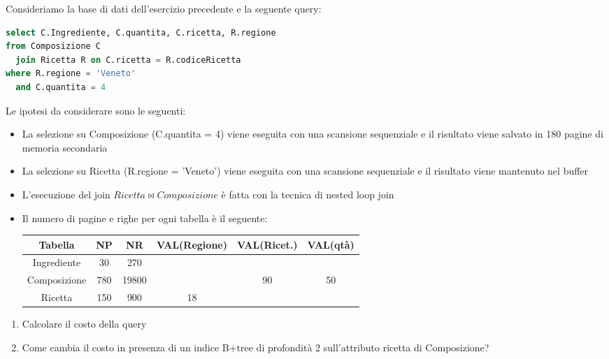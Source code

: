\documentclass[a4paper]{article}
\begin{document}
\begin{exercise}
  Consideriamo la base di dati dell'esercizio precedente e la seguente query:
\begin{lstlisting}[language=sql]
select C.Ingrediente, C.quantita, C.ricetta, R.regione
from Composizione C
  join Ricetta R on C.ricetta = R.codiceRicetta
where R.regione = 'Veneto'
  and C.quantita = 4
\end{lstlisting}
  Le ipotesi da considerare sono le seguenti:
  \begin{itemize}
    \item La selezione su Composizione (C.quantita = 4) viene eseguita con una scansione 
      sequenziale e il risultato viene salvato
      in 180 pagine di memoria secondaria

    \item La selezione su Ricetta (R.regione = 'Veneto') viene eseguita con
      una scansione sequenziale e il risultato viene mantenuto nel buffer

    \item L'esecuzione del join \( Ricetta \bowtie Composizione \) è fatta
      con la tecnica di nested loop join

    \item Il numero di pagine e righe per ogni tabella è il seguente:
      \begin{table}[H]
        \centering
        \begin{tabular}{|c|c|c|c|c|c|}
          \hline
          Tabella & NP & NR & VAL(Regione) & VAL(Ricet.) & VAL(qtà) \\
          \hline
          Ingrediente  & 30  & 270   &    &    &    \\
          Composizione & 780 & 19800 &    & 90 & 50 \\
          Ricetta      & 150 & 900   & 18 &    &    \\
          \hline
        \end{tabular}
      \end{table}
  \end{itemize}

  \begin{enumerate}
    \item Calcolare il costo della query

    \item Come cambia il costo in presenza di un indice B+tree di profondità
      2 sull'attributo ricetta di Composizione?
  \end{enumerate}


\end{exercise}
\end{document}
